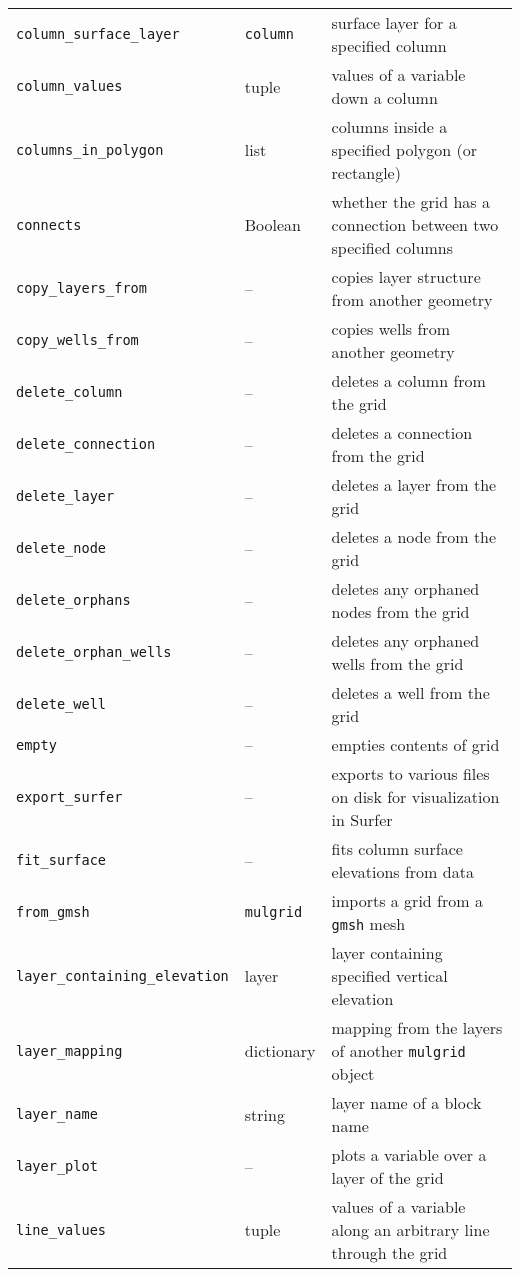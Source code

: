 \begin{center}
\begin{longtable}{|l|l|p{70mm}|}
  \texttt{column\_surface\_layer} & \texttt{column} & surface layer for a specified column\\
  \texttt{column\_values} & tuple & values of a variable down a column\\
  \texttt{columns\_in\_polygon} & list & columns inside a specified polygon (or rectangle)\\ 
  \texttt{connects} & Boolean & whether the grid has a connection between two specified columns\\ 
  \texttt{copy\_layers\_from} & -- & copies layer structure from another geometry\\ 
  \texttt{copy\_wells\_from} & -- & copies wells from another geometry\\ 
  \texttt{delete\_column} & -- & deletes a column from the grid\\ 
  \texttt{delete\_connection} & -- & deletes a connection from the grid\\ 
  \texttt{delete\_layer} & -- & deletes a layer from the grid\\ 
  \texttt{delete\_node} & -- & deletes a node from the grid\\ 
  \texttt{delete\_orphans} & -- & deletes any orphaned nodes from the grid\\ 
  \texttt{delete\_orphan\_wells} & -- & deletes any orphaned wells from the grid\\ 
  \texttt{delete\_well} & -- & deletes a well from the grid\\ 
  \texttt{empty} & --  & empties contents of grid\\
  \texttt{export\_surfer} & -- & exports to various files on disk for visualization in Surfer\\ 
  \texttt{fit\_surface} & -- & fits column surface elevations from data\\ 
  \texttt{from\_gmsh} & \texttt{mulgrid} & imports a grid from a \texttt{gmsh} mesh\\ 
  \texttt{layer\_containing\_elevation} & layer & layer containing specified vertical elevation\\
  \texttt{layer\_mapping} & dictionary & mapping from the layers of another \texttt{mulgrid} object\\
  \texttt{layer\_name} & string & layer name of a block name\\ 
  \texttt{layer\_plot} & -- & plots a variable over a layer of the grid\\
  \texttt{line\_values} & tuple & values of a variable along an arbitrary line through the grid\\

\end{longtable}
\end{center}
